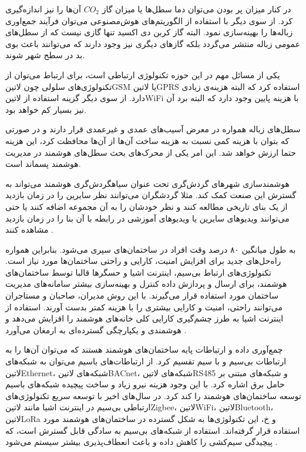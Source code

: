 در کنار میزان پر بودن می‌توان دما سطل‌ها یا میزان گاز $CO_{2}$ آن‌ها را نیز اندازه‌گیری کرد. از سوی دیگر با استفاده از الگوریتم‌های هوش‌مصنوعی می‌توان فرآیند جمع‌اوری زباله‌ها را بهینه‌سازی نمود.
البته گاز کربن دی اکسید تنها گازی نیست که از سطل‌های عمومی زباله منتشر می‌گردد بلکه گازهای دیگری نیز وجود دارند که می‌توانند باعث بوی بد در سطح شهر شوند.

یکی از مسائل مهم در این حوزه تکنولوژی ارتباطی است، برای ارتباط می‌توان از تکنولوژی‌های سلولی چون ‌لاتین{GSM} یا ‌لاتین{GPRS} استفاده کرد که البته هزینه‌ی زیادی دارد.
از سوی دیگر گزینه استفاده از ‌لاتین{WiFi} با هزینه پایین وجود دارد که البته برد آن نیز بسیار کم خواهد بود.

سطل‌های زباله همواره در معرض آسیب‌های عمدی و غیرعمدی قرار دارند و در صورتی که بتوان با هزینه کمی نسبت به هزینه ساخت آن‌ها از آن‌ها محافظت کرد، این هزینه حتما ارزش خواهد شد.
این امر یکی از محرک‌های بحث سطل‌های هوشمند در مدیریت هوشمند پسماند است.

هوشمند‌سازی شهرهای گردش‌گری تحت عنوان ‌سیاه{گردش‌گری هوشمند} می‌تواند به گسترش این صنعت کمک کند. مثلا گردشگران می‌توانند نظر سایرین را در زمان بازدید از یک بنای تاریخی مطالعه کنند و نظر خودشان را به آن مجموعه اضافه کنند
یا حتی می‌توانند ویدیوهای سایرین یا ویدیوهای آموزشی در رابطه با آن بنا را در زمان بازدید مشاهده کنند
.


به طول میانگین ۸۰ درصد وقت افراد در ساختمان‌های سپری می‌شود. بنابراین همواره راه‌حل‌های جدید برای افزایش
امنیت، کارایی و راحتی ساختمان‌ها مورد نیاز است.
تکنولوژی‌های ارتباط بی‌سیم، اینترنت اشیا و حسگرها قالبا توسط ساختمان‌های هوشمند، برای
 ارسال و پردازش داده
 کنترل و بهینه‌سازی بیشتر سامانه‌های مدیریت ساختمان
مورد استفاده قرار می‌گیرند.
با این روش مدیران، صاحبان و مستاجران می‌توانند راحتی، امنیت و کارایی بیشتری را با هزینه کمتر بدست آورند.
استفاده از اینترنت اشیا به طرز چشم‌گیری کارایی کلی خانه‌های هوشمند را افزایش می‌دهد و هوشمندی و یکپارچگی
گسترده‌ای به ارمغان می‌آورد
.

چمع‌آوری داده و ارتباطات پایه ساختمان‌های هوشمند هستند که می‌توان آن‌ها را به ارتباطات بی‌سیم و با سیم تقسیم کرد.
از ارتباطات‌های باسیم می‌توان به شبکه‌های ‌لاتین{Ethernet}، شبکه‌های ‌لاتین{BACnet}، شبکه‌های ‌لاتین{RS485}
و شبکه‌های مبتنی بر حامل برق اشاره کرد. با این وجود هزینه نیرو زیاد و ساخت پیچیده شبکه‌های باسیم توسعه ساختمان‌های هوشمند را
کند کرد. در سال‌های اخیر با توسعه سریع تکنولوژی‌های ارتباطی بی‌سیم در اینترنت اشیا مانند ‌لاتین{Zigbee}، ‌لاتین{WiFi}،
‌لاتین{Bluetooth}، ‌لاتین{LoRa} و ‌خ، این تکنولوژی‌ها به شکل گسترده در ساختمان‌های هوشمند مورد استفاده قرار گرفته‌اند.
استفاده از شبکه‌های بی‌سیم به سادگی قابل گسترش است، که پیچیدگی سیم‌کشی را کاهش داده و باعث انعطاف‌پذیری بیشتر سیستم می‌شود
.

